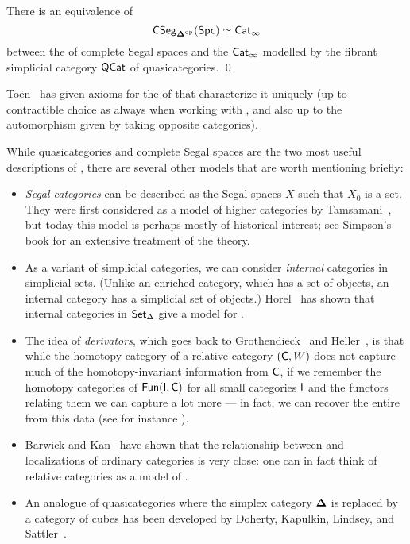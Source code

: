 \documentclass[a4paper,11pt]{article}
\begin{document}
\begin{thm}
  There is an equivalence of \icats{}
  \[ \textup{\textsf{CSeg}}_{\boldsymbol{\Delta}^{\text{\textup{op}}}}(\textup{\textsf{Spc}}) \simeq \textup{\textsf{Cat}}_\infty \]
  between the \icat{} of complete Segal spaces and the \icat{} $\textup{\textsf{Cat}}_\infty$
  modelled by the fibrant simplicial category $\textup{\textsf{QCat}}$ of quasicategories. \qed
\end{thm}

\begin{remark}
  To\"en~\cite{ToenVers} has given axioms for the \icat{} of \icats{}
  that characterize it uniquely (up to contractible choice as always
  when working with \icats{}, and also up to the automorphism given by
  taking opposite categories).
\end{remark}

\begin{remark}
  While quasicategories and complete Segal spaces are the two most
  useful descriptions of \icats{}, there are several other models that
  are worth mentioning briefly:
  \begin{itemize}
  \item \emph{Segal categories} can be described as the Segal spaces
    $X$ such that $X_{0}$ is a set. They were first considered as a
    model of higher categories by Tamsamani~\cite{Tamsamani}, but today this
    model is perhaps mostly of historical interest; see Simpson's book
    \cite{Simpson} for an extensive treatment of the theory.
  \item As a variant of simplicial
    categories, we can consider \emph{internal} categories in
    simplicial sets. (Unlike an enriched category, which has a set of
    objects, an internal
    category has a simplicial set of
    objects.) Horel~\cite{HorelInternal} has shown that internal
    categories in $\textup{\textsf{Set}}_{\Delta}$ give a model for \icats{}.
  \item The idea of \emph{derivators}, which goes back to
    Grothendieck~\cite{GrothendieckStacks,GrothendieckDer} and
    Heller~\cite{Heller}, is that while the homotopy category of a
    relative category $(\textup{\textsf{C}}, W)$ does not capture much of the
    homotopy-invariant information from $\textup{\textsf{C}}$, if we remember the
    homotopy categories of $\textup{\textsf{Fun}}(\textup{\textsf{I}},\textup{\textsf{C}})$ for all small categories
    $\textup{\textsf{I}}$ and the functors relating them we can capture a lot more ---
    in fact, we can recover the entire \icat{} from this data (see for
    instance \cite{Renaudin,Prederiv}).
  \item Barwick and Kan~\cite{BarwickKan} have shown that the
    relationship between \icats{} and localizations of ordinary
    categories is very close: one can in fact think of relative
    categories as a model of \icats{}.
  \item An analogue of quasicategories where the simplex category
    $\boldsymbol{\Delta}$ is replaced by a category of cubes has been developed by
    Doherty, Kapulkin, Lindsey, and Sattler~\cite{DKLSCube}.
  \end{itemize}
\end{remark}
\end{document}
